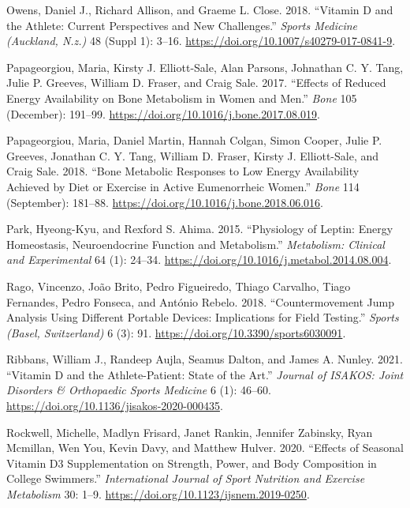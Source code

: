 \documentclass[
]{article}
\newlength{\cslhangindent}
\newenvironment{CSLReferences}[2] %
 {\begin{list}{}{%
  \setlength{\itemindent}{0pt}
  \setlength{\leftmargin}{0pt}
  \setlength{\parsep}{0pt}
  \ifodd #1
   \setlength{\leftmargin}{\cslhangindent}
   \setlength{\itemindent}{-1\cslhangindent}
  \fi
  \setlength{\itemsep}{#2\baselineskip}}}
 {\end{list}}
\begin{document}
\begin{CSLReferences}{1}{0}
Owens, Daniel J., Richard Allison, and Graeme L. Close. 2018. {``Vitamin {D} and the {Athlete}: {Current} {Perspectives} and {New} {Challenges}.''} \emph{Sports Medicine (Auckland, N.z.)} 48 (Suppl 1): 3--16. \url{https://doi.org/10.1007/s40279-017-0841-9}.

Papageorgiou, Maria, Kirsty J. Elliott-Sale, Alan Parsons, Johnathan C. Y. Tang, Julie P. Greeves, William D. Fraser, and Craig Sale. 2017. {``Effects of Reduced Energy Availability on Bone Metabolism in Women and Men.''} \emph{Bone} 105 (December): 191--99. \url{https://doi.org/10.1016/j.bone.2017.08.019}.

Papageorgiou, Maria, Daniel Martin, Hannah Colgan, Simon Cooper, Julie P. Greeves, Jonathan C. Y. Tang, William D. Fraser, Kirsty J. Elliott-Sale, and Craig Sale. 2018. {``Bone Metabolic Responses to Low Energy Availability Achieved by Diet or Exercise in Active Eumenorrheic Women.''} \emph{Bone} 114 (September): 181--88. \url{https://doi.org/10.1016/j.bone.2018.06.016}.

Park, Hyeong-Kyu, and Rexford S. Ahima. 2015. {``Physiology of Leptin: Energy Homeostasis, Neuroendocrine Function and Metabolism.''} \emph{Metabolism: Clinical and Experimental} 64 (1): 24--34. \url{https://doi.org/10.1016/j.metabol.2014.08.004}.

Rago, Vincenzo, João Brito, Pedro Figueiredo, Thiago Carvalho, Tiago Fernandes, Pedro Fonseca, and António Rebelo. 2018. {``Countermovement {Jump} {Analysis} {Using} {Different} {Portable} {Devices}: {Implications} for {Field} {Testing}.''} \emph{Sports (Basel, Switzerland)} 6 (3): 91. \url{https://doi.org/10.3390/sports6030091}.

Ribbans, William J., Randeep Aujla, Seamus Dalton, and James A. Nunley. 2021. {``Vitamin {D} and the Athlete-Patient: State of the Art.''} \emph{Journal of ISAKOS: Joint Disorders \& Orthopaedic Sports Medicine} 6 (1): 46--60. \url{https://doi.org/10.1136/jisakos-2020-000435}.

Rockwell, Michelle, Madlyn Frisard, Janet Rankin, Jennifer Zabinsky, Ryan Mcmillan, Wen You, Kevin Davy, and Matthew Hulver. 2020. {``Effects of {Seasonal} {Vitamin} {D3} {Supplementation} on {Strength}, {Power}, and {Body} {Composition} in {College} {Swimmers}.''} \emph{International Journal of Sport Nutrition and Exercise Metabolism} 30: 1--9. \url{https://doi.org/10.1123/ijsnem.2019-0250}.


\end{CSLReferences}
\end{document}
